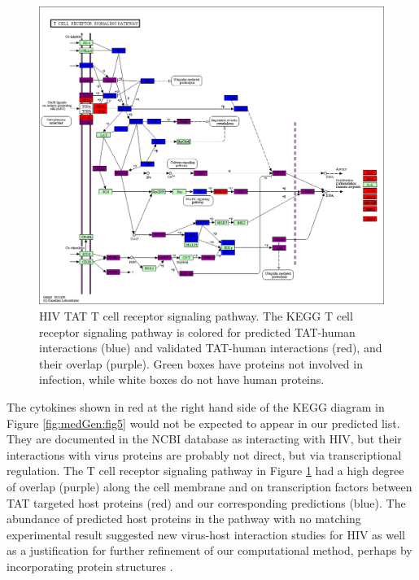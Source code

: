 \begin{figure}
\begin{center}
\includegraphics[scale=0.25]{figs/medGen_6}
\end{center}
\caption[HIV TAT T cell receptor signaling pathway]{\small HIV TAT T
  cell receptor signaling pathway. The KEGG T cell receptor signaling
  pathway is colored for predicted TAT-human interactions (blue) and
  validated TAT-human interactions (red), and their overlap
  (purple). Green boxes have proteins not involved in infection, while
  white boxes do not have human proteins. \label{fig:medGen:fig6}}
\end{figure}

The cytokines shown in red at the right hand side of the KEGG diagram
in Figure \ref{fig:medGen:fig5} would not be expected to appear in our
predicted list. They are documented in the NCBI database as interacting
with HIV, but their interactions with virus proteins are probably not
direct, but via transcriptional regulation. The T cell receptor
signaling pathway in Figure \ref{fig:medGen:fig6} had a high degree of
overlap (purple) along the cell membrane and on transcription factors
between TAT targeted host proteins (red) and our corresponding
predictions (blue). The abundance of predicted host proteins in the
pathway with no matching experimental result suggested new virus-host
interaction studies for HIV as well as a justification for further
refinement of our computational method, perhaps by incorporating
protein structures \cite{doolittle2010structural}.

